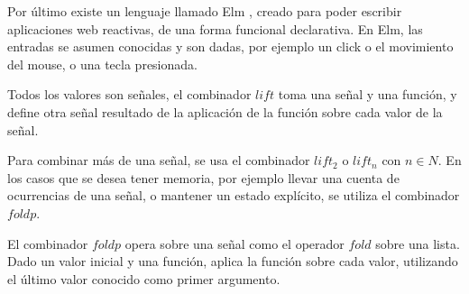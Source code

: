 

Por último existe un lenguaje llamado Elm \cite{evanczaplicki2012:Elm},
creado para poder escribir aplicaciones web reactivas,
de una forma funcional declarativa.
  En Elm, las entradas se asumen conocidas y son dadas,
por ejemplo un click o el movimiento del mouse,
o una tecla presionada.

  Todos los valores son señales, el combinador $lift$
toma una señal y una función, y define otra señal resultado
de la aplicación de la función sobre cada valor de la señal.

  Para combinar más de una señal, se usa el combinador $lift_2$ o
$lift_n$ con $n \in N$.
  En los casos que se desea tener memoria, por ejemplo llevar una
cuenta de ocurrencias de una señal, o mantener un estado explícito,
se utiliza el combinador $foldp$.

  El combinador $foldp$ opera sobre una señal como el
operador $fold$ sobre una lista.
  Dado un valor inicial y una función, aplica la función sobre
cada valor, utilizando el último valor conocido como primer argumento.


